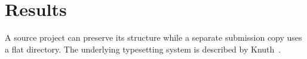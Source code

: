 \section{Results}
\label{sec:results}
A source project can preserve its structure while a separate submission copy
uses a flat directory. The underlying typesetting system is described
by Knuth~\cite{knuth1984}.
